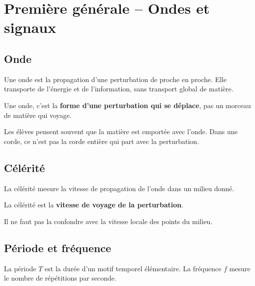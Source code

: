 \documentclass[11pt,a4paper]{article}
\begin{document}
\newpage

\section{Première générale -- Ondes et signaux}

\subsection{Onde}

\begin{sens}
Une onde est la propagation d'une perturbation de proche en proche.
Elle transporte de l'énergie et de l'information, sans transport global de matière.
\end{sens}

\begin{imagem}
Une onde, c'est la \textbf{forme d'une perturbation qui se déplace},
pas un morceau de matière qui voyage.
\end{imagem}

\begin{fausseintuition}
Les élèves pensent souvent que la matière est emportée avec l'onde.
Dans une corde, ce n'est pas la corde entière qui part avec la perturbation.
\end{fausseintuition}

\subsection{Célérité}

\begin{sens}
La célérité mesure la vitesse de propagation de l'onde dans un milieu donné.
\end{sens}

\begin{imagem}
La célérité est la \textbf{vitesse de voyage de la perturbation}.
\end{imagem}

\begin{fausseintuition}
Il ne faut pas la confondre avec la vitesse locale des points du milieu.
\end{fausseintuition}

\subsection{Période et fréquence}

\begin{sens}
La période \(T\) est la durée d'un motif temporel élémentaire.
La fréquence \(f\) mesure le nombre de répétitions par seconde.
\end{sens}
\end{document}
